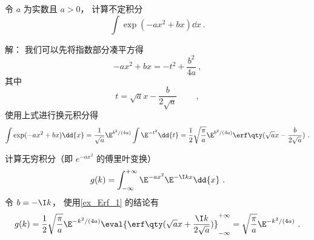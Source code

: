 \begin{example}{}\label{ex_Erf_1}
令 $a$ 为实数且 $a > 0$， 计算不定积分
\begin{equation}
\int \exp(-ax^2 + bx) \dd{x}~.
\end{equation}

解： 我们可以先将指数部分凑平方得
\begin{equation}
-ax^2 + bx = -t^2 + \frac{b^2}{4a}~,
\end{equation}
其中
\begin{equation}
t = \sqrt{a} x - \frac{b}{2\sqrt{a}} \qquad~,
\end{equation}
使用上式进行换元积分得
\begin{equation}
\int \exp(-ax^2 + bx) \dd{x} = \frac{1}{\sqrt{a}} \E^{{b^2}/(4a)} \int \E^{-t^2} \dd{t}
= \frac12 \sqrt{\frac{\pi}{a}} \E^{{b^2}/(4a)} \erf\qty(\sqrt{a} x - \frac{b}{2\sqrt{a}})~.
\end{equation}
\end{example}

\begin{example}{}\label{ex_Erf_2}
计算无穷积分（即 $e^{-ax^2}$ 的傅里叶变换）
\begin{equation}
g(k) = \int_{-\infty}^{+\infty} \E^{-a x^2} \E^{-\I kx} \dd{x}~.
\end{equation}
令 $b = -\I k$， 使用\autoref{ex_Erf_1} 的结论有
\begin{equation}\label{eq_Erf_2}
g(k) = \frac12 \sqrt{\frac{\pi}{a}} \E^{-{k^2}/(4a)} \eval{\erf\qty(\sqrt{a} x + \frac{\I k}{2\sqrt{a}})}_{-\infty}^{+\infty} = \sqrt{\frac{\pi}{a}} \E^{-{k^2}/(4a)}~.
\end{equation}
\end{example}
